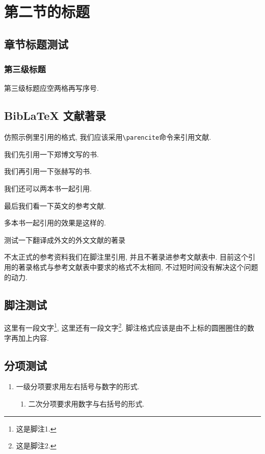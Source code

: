 
\section{第二节的标题}

\zhlipsum[1]

\subsection{章节标题测试}

\subsubsection{第三级标题}

第三级标题应空两格再写序号.

\zhlipsum[1]

\subsection{BibLaTeX 文献著录}

\nocite{*}

仿照示例里引用的格式, 我们应该采用\verb|\parencite|命令来引用文献.

我们先引用一下郑博文写的书\parencite{rudin1976principleschinese3}.

我们再引用一下张赫写的书\parencite{rudin1976principleschinese}.

我们还可以两本书一起引用\parencite{rudin1976principleschinese,rudin1976principleschinese3}.

最后我们看一下英文的参考文献\parencite{rudin1976principles}.

多本书一起引用的效果是这样的\parencite{rudin1976principleschinese,rudin1976principleschinese3, rudin1976principles, rudin1976principleschinese2}.

测试一下翻译成外文的外文文献的著录\parencite{sally_history_1985}

不太正式的参考资料我们在脚注里引用, 并且不著录进参考文献表中. 目前这个引用的著录格式与参考文献表中要求的格式不太相同, 不过短时间没有解决这个问题的动力.

\zhlipsum[1]

\subsection{脚注测试}

这里有一段文字\footnote{这是脚注1.}, 这里还有一段文字\footnote{这是脚注2.}. 脚注格式应该是由不上标的圆圈圈住的数字再加上内容.

\zhlipsum

\subsection{分项测试}

\begin{enumerate}
  \item 一级分项要求用左右括号与数字的形式.
  \begin{enumerate}
    \item 二次分项要求用数字与右括号的形式.
  \end{enumerate}
\end{enumerate}

\zhlipsum[1]

